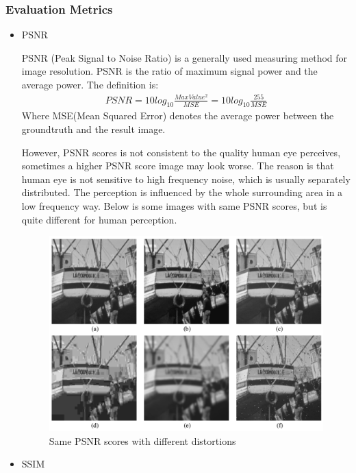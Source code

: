 \documentclass[10pt,twocolumn,letterpaper]{article}
\begin{document}
\subsubsection*{Evaluation Metrics}
\begin{itemize}
    \item PSNR 
    
    PSNR (Peak Signal to Noise Ratio) is a generally used measuring method for image resolution.
    PSNR is the ratio of maximum signal power and the average power.
    The definition is:
    \begin{align*}
        PSNR = 10log_{10}\frac{MaxValue^2}{MSE} = 10log_{10}\frac{255}{MSE}
    \end{align*}
    Where MSE(Mean Squared Error) denotes the average power between the groundtruth and the result image.

    However, PSNR scores is not consistent to the quality human eye perceives, sometimes a higher PSNR score image may look worse.
    The reason is that human eye is not sensitive to high frequency noise, which is usually separately distributed. 
    The perception is influenced by the whole surrounding area in a low frequency way.
    Below is some images with same PSNR scores, but is quite different for human perception. 
    \begin{figure}[H]
        \centering
        \includegraphics[scale = 0.3]{images/PSNR.png}
        \caption{Same PSNR scores with different distortions}
    \end{figure}

    \item SSIM
    

\end{itemize}
\end{document}
